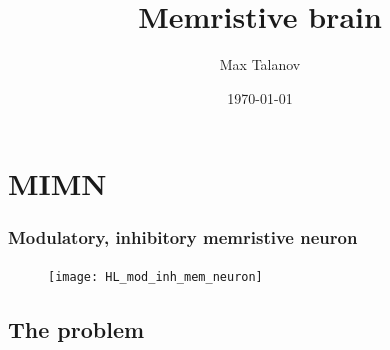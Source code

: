 \documentclass[12pt, aspectratio=169]{beamer}
\title[Memristive brain]{Memristive brain} %
\author[Max Talanov]{
  Max Talanov
}
\institute[Neurolab: KFU]%
{
Neuro-biology lab /ITIS, KFU \\ %
\medskip
\textit{max.talanov@gmail.com} %
}
\date{\today} %
\begin{document}
\begin{frame}
\titlepage %
\end{frame}


\section{MIMN}

\begin{frame}
  \frametitle{Modulatory, inhibitory memristive neuron}
  \begin{figure}
    \texttt{[image: HL\_mod\_inh\_mem\_neuron]}
  \end{figure}

\end{frame}


\subsection{The problem} %
\end{document}
